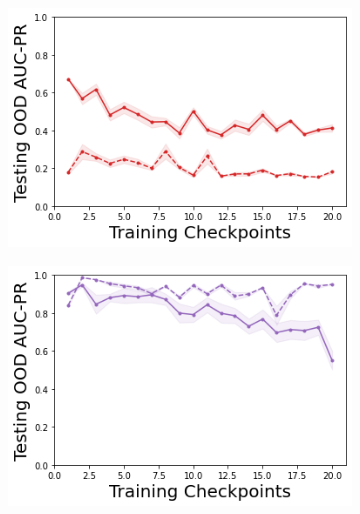 \begin{figure}
    \begin{subfigure}{.24\textwidth}
        \includegraphics[width=\textwidth]{sections/011_icml2022/resources/DropOut-LunarLanderOOD-v0-AUC-PR-out-epistemic_-testing-strategy.png}
    \end{subfigure}
    \begin{subfigure}{.24\textwidth}
        \includegraphics[width=\textwidth]{sections/011_icml2022/resources/Ensemble-LunarLanderOOD-v0-AUC-PR-out-epistemic_-testing-strategy.png}
    \end{subfigure}
    \begin{subfigure}{.24\textwidth}

\end{subfigure}
\end{figure}
